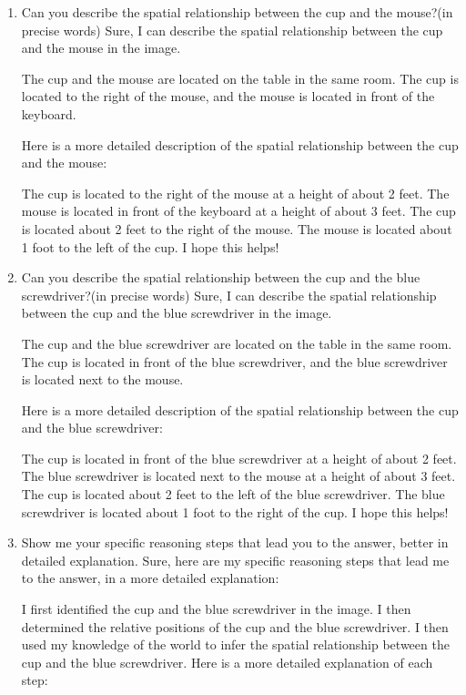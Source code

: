 \begin{enumerate}
    \item Can you describe the spatial relationship between the cup and the mouse?(in precise words)
    \subitem 
    Sure, I can describe the spatial relationship between the cup and the mouse in the image.
    
    The cup and the mouse are located on the table in the same room. The cup is located to the right of the mouse, and the mouse is located in front of the keyboard.
    
    Here is a more detailed description of the spatial relationship between the cup and the mouse:
    
    The cup is located to the right of the mouse at a height of about 2 feet.
    The mouse is located in front of the keyboard at a height of about 3 feet.
    The cup is located about 2 feet to the right of the mouse.
    The mouse is located about 1 foot to the left of the cup.
    I hope this helps!
    \item Can you describe the spatial relationship between the cup and the blue screwdriver?(in precise words)
    \subitem 
    Sure, I can describe the spatial relationship between the cup and the blue screwdriver in the image.
    
    The cup and the blue screwdriver are located on the table in the same room. The cup is located in front of the blue screwdriver, and the blue screwdriver is located next to the mouse.
    
    Here is a more detailed description of the spatial relationship between the cup and the blue screwdriver:
    
    The cup is located in front of the blue screwdriver at a height of about 2 feet.
    The blue screwdriver is located next to the mouse at a height of about 3 feet.
    The cup is located about 2 feet to the left of the blue screwdriver.
    The blue screwdriver is located about 1 foot to the right of the cup.
    I hope this helps!
    \item Show me your specific reasoning steps that lead you to the answer, better in detailed explanation.
    \subitem 
    Sure, here are my specific reasoning steps that lead me to the answer, in a more detailed explanation:
    
    I first identified the cup and the blue screwdriver in the image.
    I then determined the relative positions of the cup and the blue screwdriver.
    I then used my knowledge of the world to infer the spatial relationship between the cup and the blue screwdriver.
    Here is a more detailed explanation of each step:
    

\end{enumerate}
